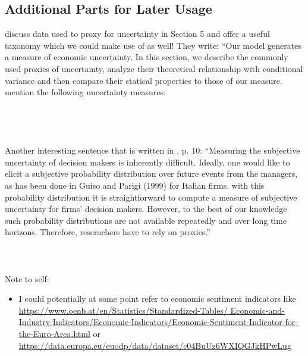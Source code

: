\documentclass[a4paper,12pt,oneside,pointednumbers,bibtotoc,bigheadings,liststotoc]{scrbook}
\begin{document}
\subsection{Additional Parts for Later Usage}
\citet{orlikandveldkamp:14} discuss data used to proxy for uncertainty in Section 5 and offer a useful taxonomy which we could make use of as well! They write: ``Our model generates a measure of economic uncertainty. In this section, we describe the commonly used proxies of uncertainty, analyze their theoretical relationship with conditional variance and then compare their statical properties to those of our measure. \citet{orlikandveldkamp:14} mention the following uncertainty measures:\\
\\
\\
\\
\\
Another interesting sentence that is written in \citet{bachmannetal:13}, p. 10: ``Measuring the subjective uncertainty of decision makers is inherently difficult. Ideally, one would like to elicit a subjective probability distribution over future events from the managers, as has been done in Guiso and Parigi (1999) for Italian firms. with this probability distribution it is straightforward to compute a measure of subjective uncertainty for firms' decision makers. However, to the best of our knowledge such probability distributions are not available repeatedly and over long time horizons. Therefore, reserachers have to rely on proxies.'' \\
\\
\\
\\
Note to self: 
\begin{itemize}
	\item I could potentially at some point refer to economic sentiment indicators like \url{https://www.oenb.at/en/Statistics/Standardized-Tables/
	Economic-and-Industry-Indicators/Economic-Indicators/Economic-Sentiment-Indicator-for-the-Euro-Area.html} or \url{https://data.europa.eu/euodp/data/dataset/c04BuUz6WXIQGJkHPwLug}
\end{itemize}
\end{document}
